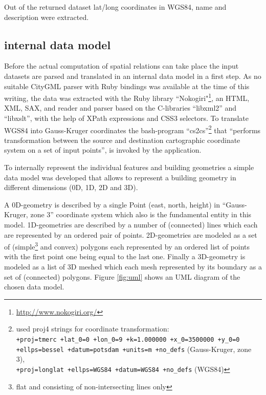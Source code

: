 \documentclass[paper=a4, fontsize=11pt]{scrartcl} %
\numberwithin{equation}{section} %
\numberwithin{figure}{section} %
\numberwithin{table}{section} %
\begin{document}
Out of the returned dataset lat/long coordinates in WGS84, name and description were extracted. 

\subsection{internal data model}\label{sec:internal-data-model}
Before the actual computation of spatial relations can take place the input datasets are parsed and translated in an internal data model in a first step. As no suitable CityGML parser with Ruby bindings was available at the time of this writing, the data was extracted with the Ruby library ``Nokogiri"\footnote{\url{http://www.nokogiri.org/}}, an HTML, XML, SAX, and reader and parser based on the C-libraries ``libxml2'' and ``libxslt'', with the help of XPath expressions and CSS3 selectors. To translate WGS84 into Gauss-Kruger coordinates the bash-program ``cs2cs''\footnote{used proj4 strings for coordinate transformation: \\ \texttt{+proj=tmerc +lat\_0=0 +lon\_0=9 +k=1.000000 +x\_0=3500000 +y\_0=0 +ellps=bessel +datum=potsdam +units=m +no\_defs} (Gauss-Kruger, zone 3), \\ \texttt{+proj=longlat +ellps=WGS84 +datum=WGS84 +no\_defs} (WGS84)} that ``performs transformation between the source and destination cartographic coordinate system on a set of input points'', is invoked by the application. 

To internally represent the individual features and building geometries a simple data model was developed that allows to represent a building geometry in different dimensions (0D, 1D, 2D and 3D). 

A 0D-geometry is described by a single Point (east, north, height) in ``Gauss-Kruger, zone 3'' coordinate system which also is the fundamental entity in this model. 1D-geometries are described by a number of (connected) lines which each are represented by an ordered pair of points. 2D-geometries are modeled as a set of (simple\footnote{flat and consisting of non-intersecting lines only} and convex) polygons each represented by an ordered list of points with the first point one being equal to the last one.  Finally a 3D-geometry is modeled as a list of 3D meshed which each mesh represented by its boundary as a set of (connected) polygons. Figure \ref{fig:uml} shows an UML diagram of the chosen data model.     
\end{document}
